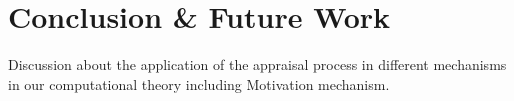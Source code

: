 \documentclass[letterpaper]{article}
\begin{document}
\section{Conclusion \& Future Work}

Discussion about the application of the appraisal process in different
mechanisms in our computational theory including Motivation mechanism. 



\end{document}
